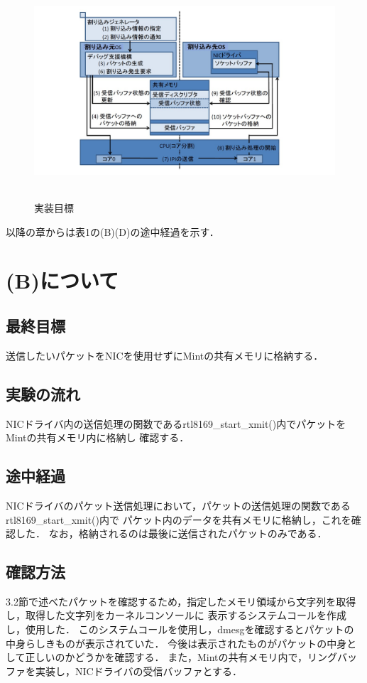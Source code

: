 \documentclass[12pt]{jsarticle}
\begin{document}
\begin{figure}[t]
\begin{center}
\includegraphics[height=8.0cm]{./fig1.jpg}          
\caption{実装目標}
\label{fig:up}
\end{center}
\end{figure}

以降の章からは表1の(B)(D)の途中経過を示す．



\section{(B)について}
\subsection{最終目標}
送信したいパケットをNICを使用せずにMintの共有メモリに格納する．
\subsection{実験の流れ}
NICドライバ内の送信処理の関数であるrtl8169\_start\_xmit()内でパケットをMintの共有メモリ内に格納し
確認する．
\subsection{途中経過}
NICドライバのパケット送信処理において，パケットの送信処理の関数であるrtl8169\_start\_xmit()内で
パケット内のデータを共有メモリに格納し，これを確認した．
なお，格納されるのは最後に送信されたパケットのみである．

\subsection{確認方法}
3.2節で述べたパケットを確認するため，指定したメモリ領域から文字列を取得し，取得した文字列をカーネルコンソールに
表示するシステムコールを作成し，使用した．
このシステムコールを使用し，dmesgを確認するとパケットの中身らしきものが表示されていた．
今後は表示されたものがパケットの中身として正しいのかどうかを確認する．
また，Mintの共有メモリ内で，リングバッファを実装し，NICドライバの受信バッファとする．
\end{document}
